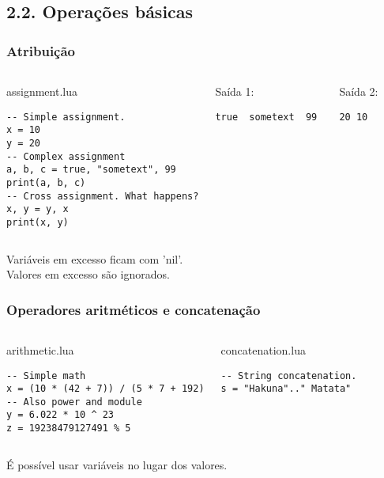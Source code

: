 \documentclass[brazil]{beamer}
\begin{document}
\subsection{2.2. Operações básicas}
\begin{frame}[fragile]
  \frametitle{Atribuição}
  \pause
  \begin{columns}
      \begin{block}{assignment.lua}
        \begin{lstlisting}
-- Simple assignment.
x = 10
y = 20
-- Complex assignment
a, b, c = true, "sometext", 99
print(a, b, c)
-- Cross assignment. What happens?
x, y = y, x
print(x, y)
        \end{lstlisting}
      \end{block}
    \pause
      \begin{block}{Saída 1:}
        \begin{verbatim}
true  sometext  99 \end{verbatim}
      \end{block}
      \pause
      \begin{block}{Saída 2:}
        \begin{verbatim}
20 10 \end{verbatim}
      \end{block}
  \end{columns}
  \pause
  \begin{center}
    Variáveis em excesso ficam com 'nil'. \\
    Valores em excesso são ignorados.
  \end{center}
\end{frame}
\begin{frame}[fragile]
  \frametitle{Operadores aritméticos e concatenação}
  \pause
  \begin{columns}
      \begin{block}{arithmetic.lua}
        \begin{lstlisting}
-- Simple math
x = (10 * (42 + 7)) / (5 * 7 + 192)
-- Also power and module
y = 6.022 * 10 ^ 23
z = 19238479127491 % 5
        \end{lstlisting}
      \end{block}
    \pause
      \begin{block}{concatenation.lua}
        \begin{lstlisting}
-- String concatenation.
s = "Hakuna".." Matata"
        \end{lstlisting}
      \end{block}
  \end{columns}
  \pause
  \begin{center}
    É possível usar variáveis no lugar dos valores.
  \end{center}
\end{frame}
\end{document}
